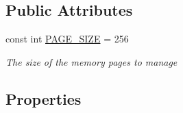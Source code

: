 \subsection*{Public Attributes}
\begin{DoxyCompactItemize}
\item 
const int \hyperlink{class_c_p_u___o_s___simulator_1_1_memory_1_1_memory_page_a502abee83030136a808d5b5f0c0fe7ec}{P\+A\+G\+E\+\_\+\+S\+I\+Z\+E} = 256
\begin{DoxyCompactList}\small\item\em The size of the memory pages to manage \end{DoxyCompactList}\end{DoxyCompactItemize}
\subsection*{Properties}
